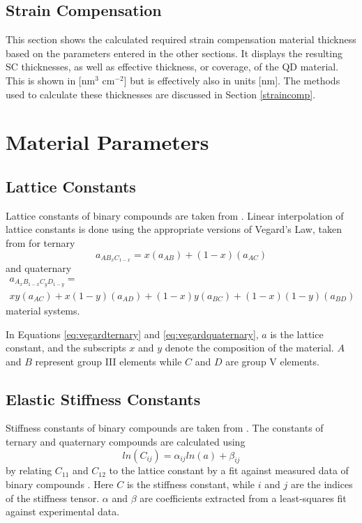 \documentclass{article}
\begin{document}
\subsection{Strain Compensation}
This section shows the calculated required strain compensation material thickness based on the parameters entered in the other sections. It displays the resulting SC thicknesses, as well as effective thickness, or coverage, of the QD material. This is shown in [nm$^{3}$ cm$^{-2}$] but is effectively also in units [nm]. The methods used to calculate these thicknesses are discussed in Section \ref{straincomp}.
\section{Material Parameters}

\subsection{Lattice Constants}
\label{latticeconstant}
Lattice constants of binary compounds are taken from \citeauthor{vurgaftman_band_2001} \cite{vurgaftman_band_2001}. Linear interpolation of lattice constants is done using the appropriate versions of Vegard's Law, taken from \citeauthor{adachi_band_1987} \cite{adachi_band_1987} for ternary
\begin{equation}
	\label{eq:vegardternary}
	a_{AB_{x}C_{1-x}}=x(a_{AB})+(1-x)(a_{AC})
\end{equation}
and quaternary
\begin{multline}
\label{eq:vegardquaternary}
a_{A_{x}B_{1-x}C_{y}D_{1-y}}=\\xy(a_{AC})+x(1-y)(a_{AD})
+(1-x)y(a_{BC})+(1-x)(1-y)(a_{BD})
\end{multline}
material systems.

In Equations \ref{eq:vegardternary} and \ref{eq:vegardquaternary}, \(a\) is the lattice constant, and the subscripts \(x\) and \(y\) denote the composition of the material. \(A\) and \(B\) represent group III elements while \(C\) and \(D\) are group V elements.

\FloatBarrier
\subsection{Elastic Stiffness Constants}
\label{stiffnessconstant}
Stiffness constants of binary compounds are taken from \citeauthor{vurgaftman_band_2001} \cite{vurgaftman_band_2001}. The constants of ternary and quaternary compounds are calculated using
\begin{equation}
\label{eq:adachistiffness}
ln(C_{ij})=\alpha_{ij}ln(a)+\beta_{ij}
\end{equation}
by \citeauthor{adachi_properties_2005} relating \(C_{11}\) and \(C_{12}\) to the lattice constant by a fit against measured data of binary compounds \cite[pp. 47-49]{adachi_properties_2005}. Here \(C\) is the stiffness constant, while \(i\) and \(j\) are the indices of the stiffness tensor. \(\alpha\) and \(\beta\) are coefficients extracted from a least-squares fit against experimental data.
\end{document}
